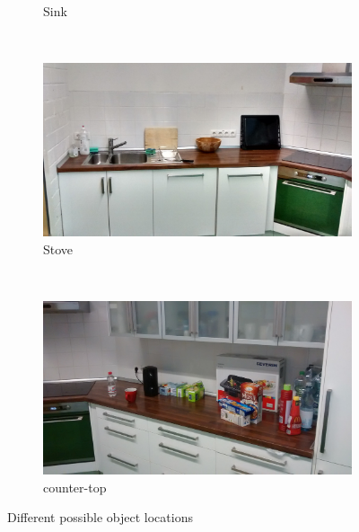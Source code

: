 \documentclass{article}
\begin{document}
{\begin{figure}
\begin{subfigure}[b]{0.3\textwidth}
        \caption{Sink}
        \label{fig:sink}
    \end{subfigure}
    ~ %
    \begin{subfigure}[b]{0.3\textwidth}
        \includegraphics[width=\textwidth]{images/stove.jpg}
        \caption{Stove}
        \label{fig:stove}
    \end{subfigure}
    ~ %
    \begin{subfigure}[b]{0.3\textwidth}
        \includegraphics[width=\textwidth]{images/counter-top.jpg}
        \caption{counter-top}
        \label{fig:counter-top}
    \end{subfigure}
    \caption{Different possible object locations}\label{fig:alllocations}
\end{figure}
\begin{figure}
    \centering
    \begin{subfigure}[b]{0.3\textwidth}

\end{subfigure}
\end{figure}}
\end{document}

